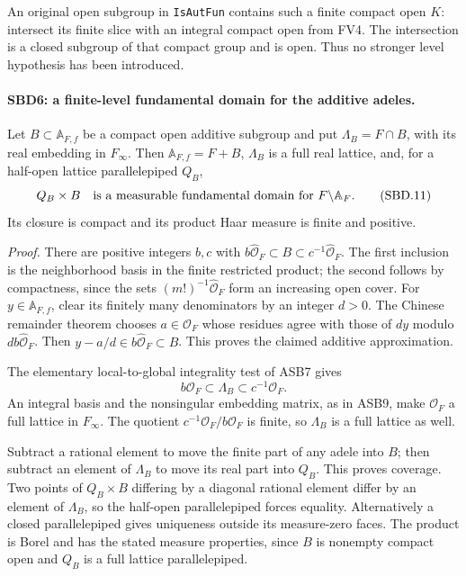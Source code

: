 An original open subgroup in \texttt{Is\allowbreak Aut\allowbreak Fun} contains such a
finite compact open \(K\): intersect its finite slice with an
integral compact open from FV4.  The intersection is a closed
subgroup of that compact group and is open.  Thus no stronger
level hypothesis has been introduced.

\paragraph{SBD6: a finite-level fundamental domain for the additive adeles.}
\label{claim:SBD6}
Let \(B\subset\mathbb A_{F,f}\) be a compact open additive
subgroup and put \(\Lambda_B=F\cap B\), with its real embedding
in \(F_\infty\).  Then
\(\mathbb A_{F,f}=F+B\), \(\Lambda_B\) is a full real lattice,
and, for a half-open lattice parallelepiped \(Q_B\),
\[
             Q_B\times B
 \quad\hbox{is a measurable fundamental domain for }
             F\backslash\mathbb A_F.
 \tag{SBD.11}
\]
Its closure is compact and its product Haar measure is finite
and positive.

\emph{Proof.}
There are positive integers \(b,c\) with
\(b\widehat{\mathcal O}_F\subset B\subset
c^{-1}\widehat{\mathcal O}_F\).  The first inclusion is the
neighborhood basis in the finite restricted product; the second
follows by compactness, since the sets
\((m!)^{-1}\widehat{\mathcal O}_F\) form an increasing open
cover.  For \(y\in\mathbb A_{F,f}\), clear its finitely many
denominators by an integer \(d>0\).  The Chinese remainder
theorem chooses \(a\in\mathcal O_F\) whose residues agree with
those of \(dy\) modulo \(db\widehat{\mathcal O}_F\).
Then \(y-a/d\in b\widehat{\mathcal O}_F\subset B\).
This proves the claimed additive approximation.

The elementary local-to-global integrality test of ASB7 gives
\[
 b\mathcal O_F\subset\Lambda_B\subset c^{-1}\mathcal O_F.
\]
An integral basis and the nonsingular embedding matrix, as in
ASB9, make \(\mathcal O_F\) a full lattice in \(F_\infty\).
The quotient \(c^{-1}\mathcal O_F/b\mathcal O_F\) is finite,
so \(\Lambda_B\) is a full lattice as well.

Subtract a rational element to move the finite part of any
adele into \(B\); then subtract an element of \(\Lambda_B\)
to move its real part into \(Q_B\).  This proves coverage.
Two points of \(Q_B\times B\) differing by a diagonal rational
element differ by an element of \(\Lambda_B\), so the half-open
parallelepiped forces equality.  Alternatively a closed
parallelepiped gives uniqueness outside its measure-zero faces.
The product is Borel and has the stated measure properties,
since \(B\) is nonempty compact open and \(Q_B\) is a full
lattice parallelepiped.


